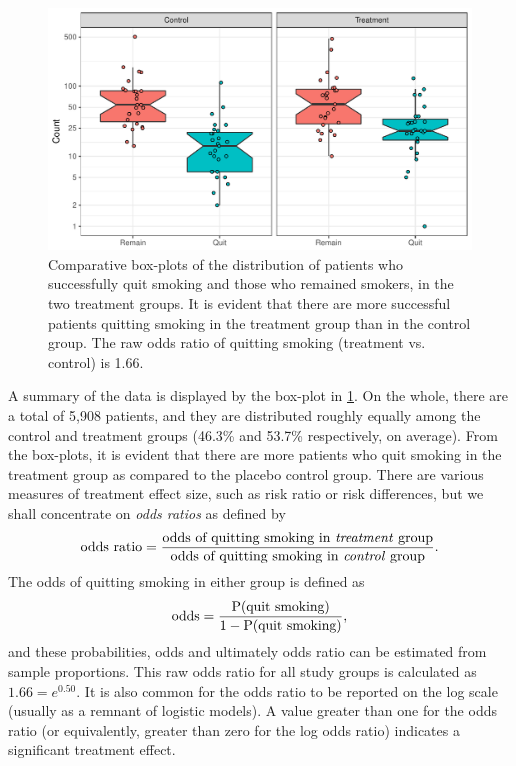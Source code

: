 \documentclass[showframe,11pt]{report}\usepackage[]{graphicx}\usepackage{xcolor}
\makeatletter
\def\maxwidth{ %
  \ifdim\Gin@nat@width>\linewidth
    \linewidth
  \else
    \Gin@nat@width
  \fi
}
\newenvironment{knitrout}{}{} %
\makeatother
\begin{document}
\begin{knitrout}
\color{fgcolor}\begin{figure}[htb]

{\centering \includegraphics[width=\maxwidth]{figure/05-plot_data_smoke-1} 

}

\caption[Comparative box-plots of the distribution of patients who successfully quit smoking and those who remained smokers, in the two treatment groups]{Comparative box-plots of the distribution of patients who successfully quit smoking and those who remained smokers, in the two treatment groups. It is evident that there are more successful patients quitting smoking in the treatment group than in the control group. The raw odds ratio of quitting smoking (treatment vs. control) is 1.66.}\label{fig:plot.data.smoke}
\end{figure}


\end{knitrout}
A summary of the data is displayed by the box-plot in \cref{fig:plot.data.smoke}.
On the whole, there are a total of 5,908
patients, and they are distributed roughly equally among the control and treatment groups (46.3\% and 53.7\% respectively, on average).
From the box-plots, it is evident that there are more patients who quit smoking in the treatment group as compared to the placebo control group.
There are various measures of treatment effect size, such as risk ratio or risk differences, but we shall concentrate on \emph{odds ratios} as defined by 
\[
  \text{odds ratio} = \frac{\text{odds of quitting smoking in \emph{treatment} group}}
  {\text{odds of quitting smoking in \emph{control} group}}.
\]
The odds of quitting smoking in either group is defined as
\[
  \text{odds} = \frac{\operatorname{P}(\text{quit smoking})}{1 - \operatorname{P}(\text{quit smoking})},
\]
and these probabilities, odds and ultimately odds ratio can be estimated from sample proportions.
This raw odds ratio for all study groups is calculated as $1.66 = e^{0.50}$.
It is also common for the odds ratio to be reported on the log scale (usually as a remnant of logistic models).
A value greater than one for the odds ratio (or equivalently, greater than zero for the log odds ratio) indicates a significant treatment effect.
\end{document}
